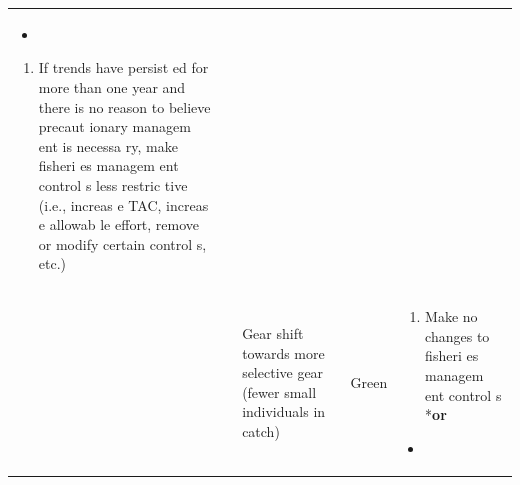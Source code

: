 \documentclass[]{book}
\providecommand{\tightlist}{%
  \setlength{\itemsep}{0pt}\setlength{\parskip}{0pt}}
\begin{document}
\begin{longtable}[]{@{}lllll@{}}
\begin{minipage}[t]{0.19\columnwidth}
\begin{itemize}
\item
\end{itemize}

\begin{enumerate}
\def\labelenumi{\arabic{enumi}.}
\setcounter{enumi}{1}
\tightlist
\item
  If trends have persist ed for more than one year and there is no
  reason to believe precaut ionary managem ent is necessa ry, make
  fisheri es managem ent control s less restric tive (i.e., increas e
  TAC, increas e allowab le effort, remove or modify certain control s,
  etc.)
\end{enumerate}\strut
\end{minipage}\tabularnewline
\begin{minipage}[t]{0.19\columnwidth}\raggedright\strut
\strut
\end{minipage} & \begin{minipage}[t]{0.19\columnwidth}\raggedright\strut
\strut
\end{minipage} & \begin{minipage}[t]{0.19\columnwidth}\raggedright\strut
Gear shift towards more selective gear (fewer small individuals in
catch)\strut
\end{minipage} & \begin{minipage}[t]{0.19\columnwidth}\raggedright\strut
Green\strut
\end{minipage} & \begin{minipage}[t]{0.19\columnwidth}\raggedright\strut
\begin{enumerate}
\def\labelenumi{\arabic{enumi}.}
\tightlist
\item
  Make no changes to fisheri es managem ent control s *\textbf{or}
\end{enumerate}

\begin{itemize}
\item
\end{itemize}


\end{minipage}
\end{longtable}
\end{document}
